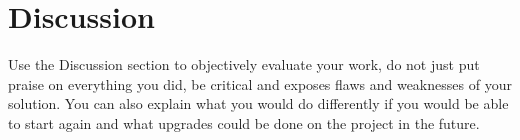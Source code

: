 \documentclass[fleqn,moreauthors,10pt]{ds_report}
\begin{document}



\section*{Discussion}

Use the Discussion section to objectively evaluate your work, do not just put praise on everything you did, be critical and exposes flaws and weaknesses of your solution. You can also explain what you would do differently if you would be able to start again and what upgrades could be done on the project in the future.




\end{document}
